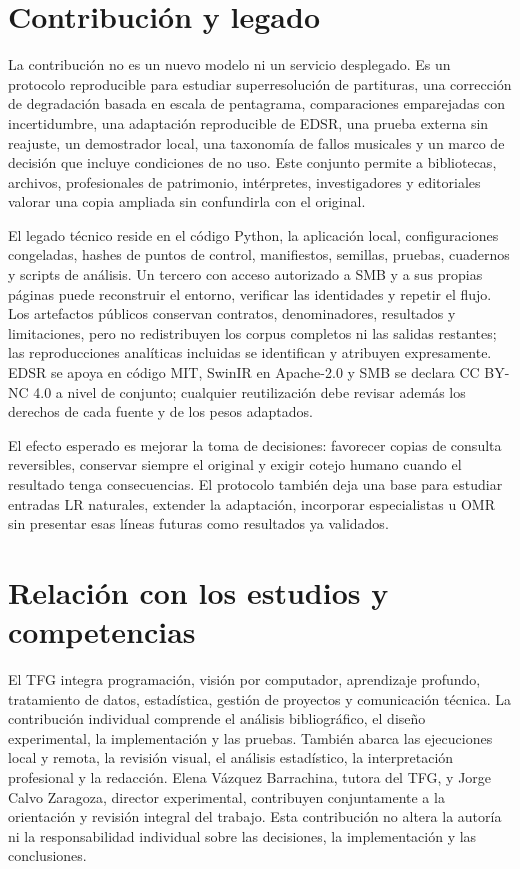 \section{Contribución y legado}
La contribución no es un nuevo modelo ni un servicio desplegado. Es un protocolo reproducible para
estudiar superresolución de partituras, una corrección de degradación basada en escala de
pentagrama, comparaciones emparejadas con incertidumbre, una adaptación reproducible de EDSR, una
prueba externa sin reajuste, un demostrador local, una taxonomía de fallos musicales y un marco de
decisión que incluye condiciones de no uso. Este conjunto permite a bibliotecas, archivos,
profesionales de patrimonio, intérpretes, investigadores y editoriales valorar una copia ampliada
sin confundirla con el original.

El legado técnico reside en el código Python, la aplicación local, configuraciones congeladas,
hashes de puntos de control, manifiestos, semillas, pruebas, cuadernos y scripts de análisis. Un
tercero con acceso autorizado a SMB y a sus propias páginas puede reconstruir el entorno, verificar
las identidades y repetir el flujo. Los artefactos públicos conservan contratos, denominadores,
resultados y limitaciones, pero no redistribuyen los corpus completos ni las salidas restantes;
las reproducciones analíticas incluidas se identifican y atribuyen expresamente. EDSR se apoya en
código MIT, SwinIR en Apache-2.0 y SMB se declara CC BY-NC 4.0 a nivel de conjunto; cualquier
reutilización debe revisar además los derechos de cada fuente y de los pesos adaptados.

El efecto esperado es mejorar la toma de decisiones: favorecer copias de consulta reversibles,
conservar siempre el original y exigir cotejo humano cuando el resultado tenga consecuencias. El
protocolo también deja una base para estudiar entradas LR naturales, extender la adaptación,
incorporar especialistas u OMR sin presentar esas líneas futuras como resultados ya validados.

\section{Relación con los estudios y competencias}
El TFG integra programación, visión por computador, aprendizaje profundo, tratamiento de datos,
estadística, gestión de proyectos y comunicación técnica. La contribución
individual comprende el análisis bibliográfico, el diseño experimental, la implementación y las
pruebas. También abarca las ejecuciones local y remota, la revisión visual, el análisis estadístico,
la interpretación profesional y la redacción. Elena Vázquez Barrachina, tutora del TFG, y Jorge
Calvo Zaragoza, director experimental, contribuyen conjuntamente a la orientación y revisión
integral del trabajo. Esta contribución no altera la autoría ni la responsabilidad individual
sobre las decisiones, la implementación y las conclusiones.

